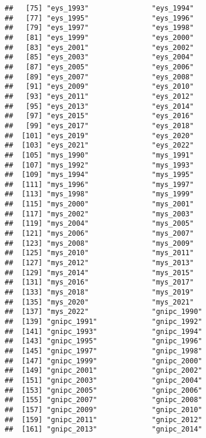 \documentclass[
]{article}
\begin{document}
\begin{verbatim}
##   [75] "eys_1993"               "eys_1994"              
##   [77] "eys_1995"               "eys_1996"              
##   [79] "eys_1997"               "eys_1998"              
##   [81] "eys_1999"               "eys_2000"              
##   [83] "eys_2001"               "eys_2002"              
##   [85] "eys_2003"               "eys_2004"              
##   [87] "eys_2005"               "eys_2006"              
##   [89] "eys_2007"               "eys_2008"              
##   [91] "eys_2009"               "eys_2010"              
##   [93] "eys_2011"               "eys_2012"              
##   [95] "eys_2013"               "eys_2014"              
##   [97] "eys_2015"               "eys_2016"              
##   [99] "eys_2017"               "eys_2018"              
##  [101] "eys_2019"               "eys_2020"              
##  [103] "eys_2021"               "eys_2022"              
##  [105] "mys_1990"               "mys_1991"              
##  [107] "mys_1992"               "mys_1993"              
##  [109] "mys_1994"               "mys_1995"              
##  [111] "mys_1996"               "mys_1997"              
##  [113] "mys_1998"               "mys_1999"              
##  [115] "mys_2000"               "mys_2001"              
##  [117] "mys_2002"               "mys_2003"              
##  [119] "mys_2004"               "mys_2005"              
##  [121] "mys_2006"               "mys_2007"              
##  [123] "mys_2008"               "mys_2009"              
##  [125] "mys_2010"               "mys_2011"              
##  [127] "mys_2012"               "mys_2013"              
##  [129] "mys_2014"               "mys_2015"              
##  [131] "mys_2016"               "mys_2017"              
##  [133] "mys_2018"               "mys_2019"              
##  [135] "mys_2020"               "mys_2021"              
##  [137] "mys_2022"               "gnipc_1990"            
##  [139] "gnipc_1991"             "gnipc_1992"            
##  [141] "gnipc_1993"             "gnipc_1994"            
##  [143] "gnipc_1995"             "gnipc_1996"            
##  [145] "gnipc_1997"             "gnipc_1998"            
##  [147] "gnipc_1999"             "gnipc_2000"            
##  [149] "gnipc_2001"             "gnipc_2002"            
##  [151] "gnipc_2003"             "gnipc_2004"            
##  [153] "gnipc_2005"             "gnipc_2006"            
##  [155] "gnipc_2007"             "gnipc_2008"            
##  [157] "gnipc_2009"             "gnipc_2010"            
##  [159] "gnipc_2011"             "gnipc_2012"            
##  [161] "gnipc_2013"             "gnipc_2014"            

\end{verbatim}
\end{document}
